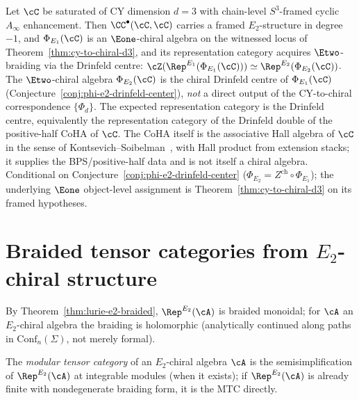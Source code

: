 \begin{conjecture}
\label{conj:e2-chiral-from-cy3}
\ClaimStatusConjectured
Let $\cC$ be saturated of CY dimension $d=3$ with chain-level
$S^3$-framed cyclic $A_\infty$ enhancement. Then $\CC^\bullet(\cC,\cC)$
carries a framed $E_2$-structure in degree $-1$, and
$\Phi_{E_1}(\cC)$ is an $\Eone$-chiral algebra
on the witnessed locus of Theorem~\ref{thm:cy-to-chiral-d3}, and its
representation category acquires $\Etwo$-braiding
via the Drinfeld centre:
$\cZ(\Rep^{E_1}(\Phi_{E_1}(\cC))) \simeq \Rep^{E_2}(\Phi_{E_2}(\cC))$.
The $\Etwo$-chiral algebra $\Phi_{E_2}(\cC)$ is the chiral Drinfeld
centre of $\Phi_{E_1}(\cC)$
(Conjecture~\ref{conj:phi-e2-drinfeld-center}), \emph{not} a direct
output of the CY-to-chiral correspondence $\{\Phi_d\}$.
The expected representation category is the Drinfeld centre, equivalently
the representation category of the Drinfeld double of the positive-half
CoHA of $\cC$. The CoHA itself is the associative Hall algebra of
$\cC$ in the sense of Kontsevich--Soibelman~\cite{KontsevichSoibelmanCoHA},
with Hall product from extension stacks; it supplies the BPS/positive-half
data and is not itself a chiral algebra.
Conditional on Conjecture~\ref{conj:phi-e2-drinfeld-center}
($\Phi_{E_2} = Z^{\mathrm{ch}} \circ \Phi_{E_1}$);
the underlying $\Eone$ object-level assignment is Theorem~\ref{thm:cy-to-chiral-d3}
on its framed hypotheses.
\end{conjecture}

\section{Braided tensor categories from \texorpdfstring{$E_2$}{E-2}-chiral structure}
\label{sec:braided-tensor-from-e2}

By Theorem~\ref{thm:lurie-e2-braided}, $\Rep^{E_2}(\cA)$ is braided
monoidal; for $\cA$ an $E_2$-chiral algebra the braiding is
holomorphic (analytically continued along paths in
$\mathrm{Conf}_n(\Sigma)$, not merely formal).

\begin{definition}
\label{def:mtc-e2-chiral}
The \emph{modular tensor category} of an $E_2$-chiral algebra $\cA$
is the semisimplification of $\Rep^{E_2}(\cA)$ at integrable modules
(when it exists); if $\Rep^{E_2}(\cA)$ is already finite with
nondegenerate braiding form, it is the MTC directly.
\end{definition}

